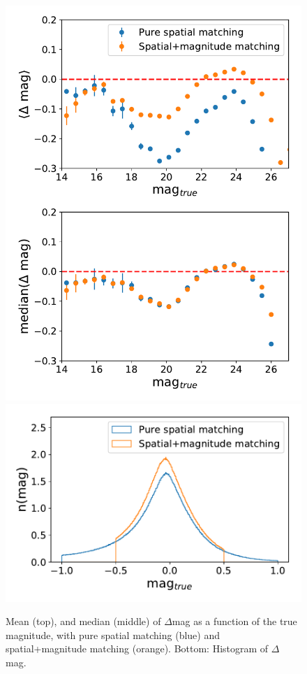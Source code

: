 \documentclass[\docopts]{\docclass}
\begin{document}
\begin{figure}
\centering
\includegraphics[width=0.9\columnwidth]{matching_comparison_galaxies.pdf}
\includegraphics[width=0.9\columnwidth]{mag_hist_total.pdf}
\caption{Mean (top), and median (middle) of $\Delta$mag as a function of the true magnitude, with pure spatial matching (blue) and spatial+magnitude matching (orange). Bottom: Histogram of $\Delta$ mag.}
\label{fig:matching_comparison}
\end{figure}
\end{document}
